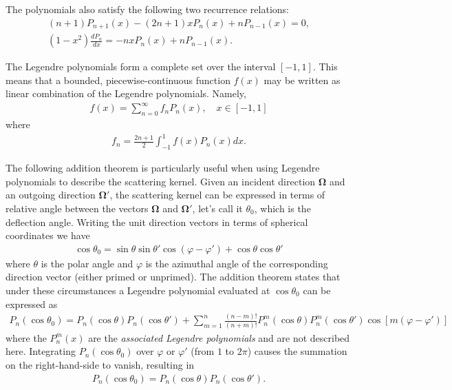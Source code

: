 \documentclass[11pt]{article}
\renewcommand\vec{\mathbf}
\begin{document}
The polynomials also satisfy the following two recurrence relations:
\begin{align}
  (n+1) P_{n+1}(x) - (2n + 1) x P_n(x) + n P_{n-1}(x) = 0, \\
  \left(1 - x^2\right) \frac{dP_n}{dx} = -n x P_n(x) + n P_{n-1}(x).
\end{align}

The Legendre polynomials form a complete set over the interval \([-1, 1]\).  This means that a bounded, piecewise-continuous function \(f(x)\) may be written as linear combination of the Legendre polynomials.  Namely,
\begin{align}
  f(x) = \sum_{n=0}^\infty f_n P_n(x), \quad x \in [-1,1]
\end{align}
where
\begin{align}
  f_n = \frac{2n+1}{2} \int_{-1}^{1} f(x) P_n(x) dx.
\end{align}

The following addition theorem is particularly useful when using Legendre polynomials to describe the scattering kernel.  Given an incident direction \(\vec{\Omega}\) and an outgoing direction \(\vec{\Omega}'\), the scattering kernel can be expressed in terms of relative angle between the vectors \(\vec{\Omega}\) and \(\vec{\Omega}'\), let's call it \(\theta_0\), which is the deflection angle.  Writing the unit direction vectors in terms of spherical coordinates we have
\begin{align}
  \cos\theta_0 = \sin\theta \sin\theta' \cos\left(\varphi - \varphi'\right) + \cos\theta \cos\theta'
\end{align}
where \(\theta\) is the polar angle and \(\varphi\) is the azimuthal angle of the corresponding direction vector (either primed or unprimed).  The addition theorem states that under these circumstances a Legendre polynomial evaluated at \(\cos\theta_0\) can be expressed as
\begin{align}
  P_n(\cos\theta_0) = P_n(\cos\theta) P_n(\cos\theta') + \sum_{m=1}^n \frac{(n-m)!}{(n+m)!} P_n^m(\cos\theta) P_n^m(\cos\theta') \cos\left[m\left(\varphi-\varphi'\right)\right]
\end{align}
where the \(P_n^m(x)\) are the \emph{associated Legendre polynomials} and are not described here.  Integrating \(P_n(\cos\theta_0)\) over \(\varphi\) or \(\varphi'\) (from \(1\) to \(2\pi\)) causes the summation on the right-hand-side to vanish, resulting in
\begin{align}
  P_n(\cos\theta_0) = P_n(\cos\theta) P_n(\cos\theta').
\end{align}
\end{document}

